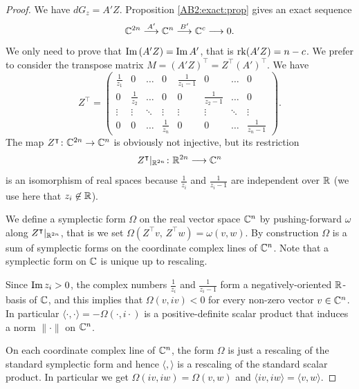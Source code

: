 \begin{proof}
We have $dG_{z} = A'Z$. Proposition \ref{AB2:exact:prop} gives an exact sequence
$$ \mathbb{C}^{2n} \stackrel{A'}{\longrightarrow} \mathbb{C}^{n} \stackrel{B'}{\longrightarrow} \mathbb{C}^c \longrightarrow 0.$$
We only need to prove that ${\rm Im\,} (A'Z) = {\rm Im\,} A'$, that is ${\rm rk} (A'Z) = n-c$. We prefer to consider the transpose matrix $M= (A'Z)^\intercal =  Z^\intercal (A')^\intercal$. We have
$$ Z^\intercal = \begin{pmatrix}
\frac 1{z_1} & 0 & \ldots & 0 & \frac {1}{z_1-1} & 0 & \ldots & 0 \\
0 & \frac 1{z_2} & \ldots & 0 & 0 & \frac {1}{z_2-1} & \ldots & 0 \\
\vdots & \vdots & \ddots & \vdots & \vdots & \vdots & \ddots & \vdots \\
0 & 0 & \ldots & \frac 1{z_n} & 0 & 0 & \ldots & \frac {1}{z_n-1} 
\end{pmatrix}.
$$
The map $Z^\intercal\colon \mathbb{C}^{2n} \to \mathbb{C}^n$ is obviously not injective, but its restriction 
$$Z^\intercal |_{\mathbb{R}^{2n}}\colon \mathbb{R}^{2n} \longrightarrow \mathbb{C}^n$$ 
is an isomorphism of real spaces because $\frac 1{z_i}$ and $\frac {1}{z_i-1}$ are independent over $\mathbb{R}$ (we use here that $z_i\not\in \mathbb{R}$).  

We define a symplectic form $\Omega$ on the real vector space $\mathbb{C}^n$ by pushing-forward $\omega$ along $Z^\intercal |_{\mathbb{R}^{2n}}$, that is we set $\Omega(Z^\intercal v,\, Z^\intercal w) = \omega(v,w)$. By construction $\Omega$ is a sum of symplectic forms on the coordinate complex lines of $\mathbb{C}^n$. Note that a symplectic form on $\mathbb{C}$ is unique up to rescaling.

Since ${\rm Im\,} z_i >0$, the complex numbers $\frac{1}{z_i}$ and $\frac{1}{z_i-1}$ form a negatively-oriented $\mathbb{R}$-basis of $\mathbb{C}$, and this implies that $\Omega (v,iv) < 0$ for every non-zero vector $v\in \mathbb{C}^n$. In particular $\langle \cdot, \cdot \rangle = -\Omega(\cdot, i \cdot)$ is a positive-definite scalar product that induces a norm $\| \cdot \|$ on $\mathbb{C}^n$. 

On each coordinate complex line of $\mathbb{C}^n$, the form $\Omega$ is just a rescaling of the standard symplectic form and hence $\langle,\rangle$ is a rescaling of the standard scalar product. In particular we get $\Omega(iv,iw) = \Omega(v,w)$ and $\langle iv, iw \rangle  = \langle v,w \rangle$.


\end{proof}
